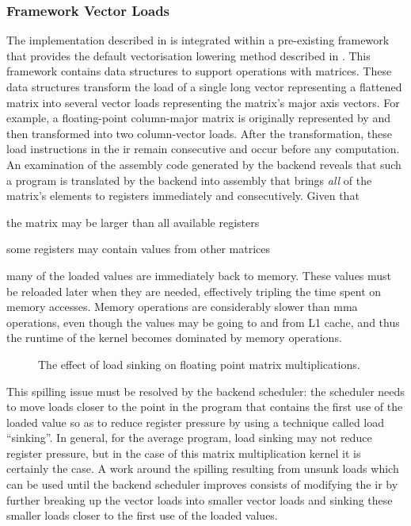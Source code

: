 \documentclass[\main/thesis.tex]{subfiles}
\begin{document}
\subsubsection{Framework Vector Loads}
\label{sec:test}
The implementation described in  is integrated within a pre-existing framework that provides the default vectorisation lowering method described in .
This framework contains data structures to support operations with matrices.
These data structures transform the load of a single long vector representing a flattened matrix into several vector loads representing the matrix's major axis vectors.
For example, a floating-point column-major matrix  is originally represented by  and then transformed into two  column-vector loads.
After the transformation, these load instructions in the \gls{ir} remain consecutive and occur before any computation.
An examination of the assembly code generated by the backend reveals that such a program is translated by the backend into assembly that brings \emph{all} of the matrix's elements to registers immediately and consecutively.
Given that
\begin{enumerate*}[itemjoin={{; }}, itemjoin*={{; and }}, label=(\arabic*), after={,}]
  \item the matrix may be larger than all available registers
  \item some registers may contain values from other matrices
\end{enumerate*}
many of the loaded values are immediately  back to memory.
These values must be reloaded later when they are needed, effectively tripling the time spent on memory accesses.
Memory operations are considerably slower than \gls{mma} operations, even though the values may be going to and from L1 cache, and thus the runtime of the kernel becomes dominated by memory operations.

\begin{figure}
  \centering
  
  \caption{The effect of load sinking on floating point matrix multiplications.}
  \label{fig:floatSink}
\end{figure}

This spilling issue must be resolved by the backend scheduler\footnotemark: the scheduler needs to move loads closer to the \gls{point} in the program that contains the first use of the loaded value so as to reduce register pressure by using a technique called load ``sinking''.
In general, for the average program, load sinking may not reduce register pressure, but in the case of this matrix multiplication kernel it is certainly the case.
A work around the spilling resulting from unsunk loads which can be used until the backend scheduler improves consists of modifying the \gls{ir} by further breaking up the vector loads into smaller vector loads and sinking these smaller loads closer to the first use of the loaded values.
\end{document}
